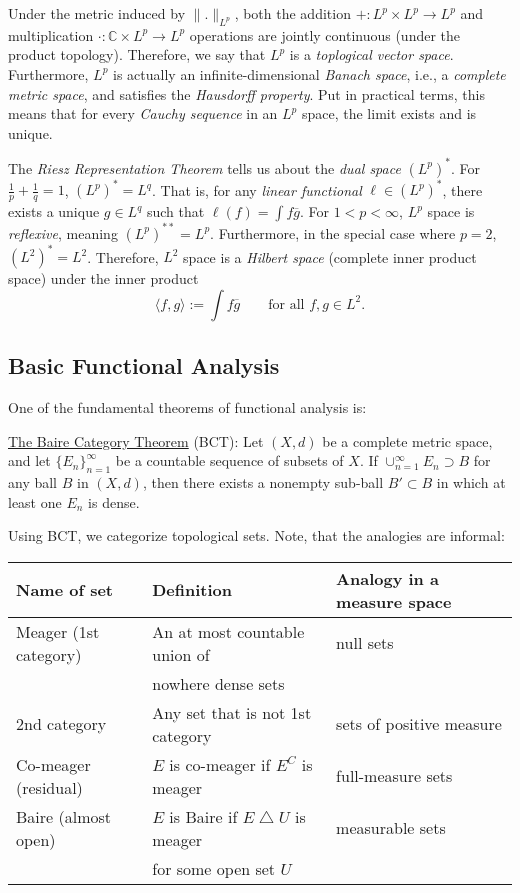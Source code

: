 \documentclass[12pt]{article}
\begin{document}
Under the metric induced by $\|.\|_{L^p}$, both the 
addition $+ : L^p \times L^p \rightarrow L^p$ and multiplication 
$\cdot : \mathbb{C} \times L^p \rightarrow L^p$ operations are jointly 
continuous (under the product topology).
Therefore, we say that $L^p$ is a {\it toplogical vector space}.
Furthermore, $L^p$ is actually an infinite-dimensional {\it Banach space},
i.e., a {\it complete metric space}, and satisfies the {\it Hausdorff property}.
Put in practical terms, this means that for every {\it Cauchy sequence} in an 
$L^p$ space, the limit exists and is unique.

The {\it Riesz Representation Theorem} tells us about the {\it dual space}
$\left( L^p \right)^*$.
For $\frac{1}{p} + \frac{1}{q} = 1$, $(L^p)^* = L^q$.
That is, for any {\it linear functional} $\ell \in (L^p)^*$, there exists a
unique $g \in L^q$ such that $\ell(f) = \int f \overline{g}$.
For $1 < p < \infty$, $L^p$ space is {\it reflexive}, meaning 
$(L^p)^{**} = L^p$.
Furthermore, in the special case where $p = 2$, $(L^2)^* = L^2$.
Therefore, $L^2$ space is a {\it Hilbert space} (complete inner product space)
under the inner product
$$
\langle f, g \rangle := \int f \overline{g}
\qquad\text{for all $f,g \in L^2$.}
$$

\subsection*{Basic Functional Analysis}

One of the fundamental theorems of functional analysis is:

\hangindent 12pt
\underline{The Baire Category Theorem} (BCT): Let $(X,d)$ be a complete metric
space, and let $\{E_n\}_{n=1}^\infty$ be a countable sequence of subsets of
$X$.
If $\cup_{n=1}^\infty E_n \supset B$ for any ball $B$ in $(X,d)$, then there
exists a nonempty sub-ball $B' \subset B$ in which at least one $E_n$ is dense.

Using BCT, we categorize topological sets.
Note, that the analogies are informal:

\begin{tabular}{|l|l|l|}
\hline
Name of set & Definition & Analogy in a measure space\\
\hline
Meager (1st category) & An at most countable union of & null sets\\
 & nowhere dense sets & \\
\hline
2nd category & Any set that is not 1st category & sets of positive measure \\
\hline
Co-meager (residual) & $E$ is co-meager if $E^C$ is meager & full-measure sets\\
\hline
Baire (almost open) & $E$ is Baire if $E \bigtriangleup U$ is meager & 
measurable sets\\ 
& for some open set $U$ & \\
\hline
\end{tabular}
\end{document}
